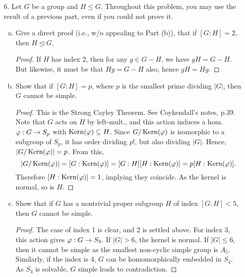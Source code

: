 \begin{itemize}
\begin{enumerate}[(a)]
\begin{enumerate}[(i)]
\begin{proof}
            This is called the $5/8$-ths Theorem, and basically states that if the probability two random group elements commute is larger than $5/8$, then then group itself is Abelian.
        \end{proof}
    \end{enumerate}
\end{enumerate}















\item[6.] Let $G$ be a group and $H \leq G$. Throughout this problem, you may use the result
of a previous part, even if you could not prove it.
\begin{enumerate}[(a)]
\item Give a direct proof (i.e., w/o appealing to Part (b)), that if $[G : H] = 2$,
then $H \trianglelefteq G.$
    \begin{proof}
        If $H$ has index 2, then for any $g \in G - H$, we have $gH = G - H$. But likewise, it must be that $Hg = G-H$ also, hence $gH = Hg$.
    \end{proof}

\item Show that if $[G : H] = p$, where $p$ is the smallest prime dividing $|G|$,
then $G$ cannot be simple.
    \begin{proof}
        This is the Strong Cayley Theorem. See Coykendall's notes, p.39. Note that $G$ acts on $H$ by left-mult., and this action induces a hom. $\varphi : G \rightarrow S_p$ with $\operatorname{Kern}(\varphi) \subseteq H$. Since $G/\operatorname{Kern}(\varphi)$ is isomorphic to a subgroup of $S_p$, it has order dividing $p!$, but also dividing $|G|$. Hence, $|G/\operatorname{Kern}(\varphi)| = p$. From this, $$|G/\operatorname{Kern}(\varphi)| = [G : \operatorname{Kern}(\varphi)] = [G : H][H: \operatorname{Kern}(\varphi)] = p [H: \operatorname{Kern}(\varphi)].$$
            Therefore $[H: \operatorname{Kern}(\varphi)]=1$, implying they coincide. As the kernel is normal, so is $H$.
    \end{proof}

\item Show that if $G$ has a nontrivial proper subgroup $H$ of index $[G : H] < 5$,
then $G$ cannot be simple.
    \begin{proof}
        The case of index 1 is clear, and 2 is settled above. For index 3, this action gives $\varphi : G \rightarrow S_3$. If $|G|>6$, the kernel is normal. If $|G| \leq 6$, then it cannot be simple as the smallest non-cyclic simple group is $A_5$. Similarly, if the index is 4, $G$ can be homomorphically embedded in $S_4$. As $S_4$ is solvable, $G$ simple leads to contradiction.
    \end{proof}
    

\end{enumerate}
\end{itemize}
